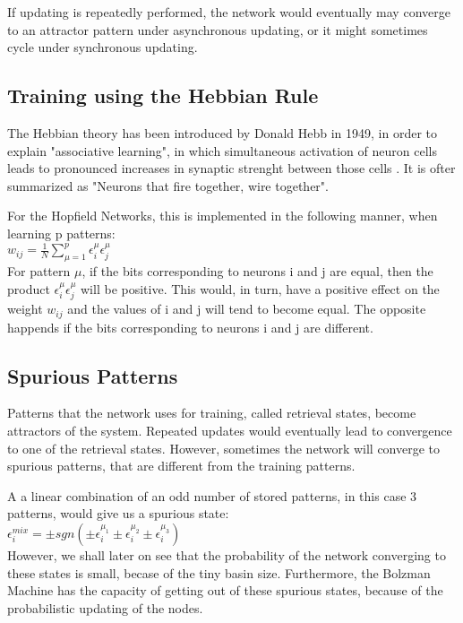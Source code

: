 If updating is repeatedly performed, the network would eventually may converge to an attractor pattern under asynchronous updating, or it might sometimes cycle under synchronous updating. 

\subsection{Training using the Hebbian Rule}

The Hebbian theory has been introduced by Donald Hebb in 1949, in order to explain "associative learning", in which simultaneous activation of neuron cells leads to pronounced increases in synaptic strenght between those cells \cite{hebb_wiki}. It is ofter summarized as "Neurons that fire together, wire together". 

For the Hopfield Networks, this is implemented in the following manner, when learning p patterns:\\

\( w_{ij}=\frac{1}{N}\sum_{\mu=1}^{p}\epsilon_{i}^\mu \epsilon_{j}^\mu \)\\

For pattern \(\mu\), if the bits corresponding to neurons i and j are equal, then the product  \( \epsilon_{i}^\mu \epsilon_{j}^\mu \) will be positive. This would, in turn, have a positive effect on the weight \(w_{ij} \) and the values of i and j will tend to become equal. The opposite happends if the bits corresponding to neurons i and j are different.

\subsection{Spurious Patterns}

Patterns that the network uses for training, called retrieval states, become attractors of the system. Repeated updates would eventually lead to convergence to one of the retrieval states. However, sometimes the network will converge to spurious patterns, that are different from the training patterns. 

A a linear combination of an odd number of stored patterns, in this case 3 patterns, would give us a spurious state:\\

\( \epsilon_{i}^{mix} = \pm sgn(\pm \epsilon_{i}^{\mu_{1}} 
			         \pm \epsilon_{i}^{\mu_{2}}
			         \pm \epsilon_{i}^{\mu_{3}}) \)\\

However, we shall later on see that the probability of the network converging to these states is small, becase of the tiny basin size. Furthermore, the Bolzman Machine has the capacity of getting out of these spurious states, because of the probabilistic updating of the nodes.			       

